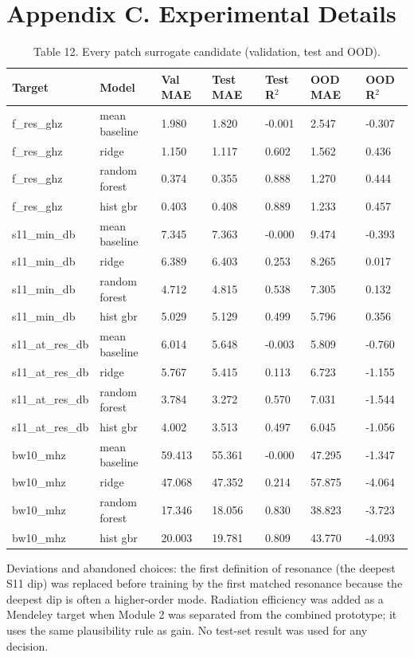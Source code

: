 \documentclass[11pt,a4paper]{article}
\begin{document}
\section*{Appendix C. Experimental Details}
\begin{table}[H]\centering\small
\caption*{Table 12. Every patch surrogate candidate (validation, test and OOD).}
\begin{tabularx}{\linewidth}{XXXXXXX}
\toprule
\textbf{Target} & \textbf{Model} & \textbf{Val MAE} & \textbf{Test MAE} & \textbf{Test R$^2$} & \textbf{OOD MAE} & \textbf{OOD R$^2$} \\
\midrule
f\_res\_ghz & mean baseline & 1.980 & 1.820 & -0.001 & 2.547 & -0.307 \\
f\_res\_ghz & ridge & 1.150 & 1.117 & 0.602 & 1.562 & 0.436 \\
f\_res\_ghz & random forest & 0.374 & 0.355 & 0.888 & 1.270 & 0.444 \\
f\_res\_ghz & hist gbr & 0.403 & 0.408 & 0.889 & 1.233 & 0.457 \\
s11\_min\_db & mean baseline & 7.345 & 7.363 & -0.000 & 9.474 & -0.393 \\
s11\_min\_db & ridge & 6.389 & 6.403 & 0.253 & 8.265 & 0.017 \\
s11\_min\_db & random forest & 4.712 & 4.815 & 0.538 & 7.305 & 0.132 \\
s11\_min\_db & hist gbr & 5.029 & 5.129 & 0.499 & 5.796 & 0.356 \\
s11\_at\_res\_db & mean baseline & 6.014 & 5.648 & -0.003 & 5.809 & -0.760 \\
s11\_at\_res\_db & ridge & 5.767 & 5.415 & 0.113 & 6.723 & -1.155 \\
s11\_at\_res\_db & random forest & 3.784 & 3.272 & 0.570 & 7.031 & -1.544 \\
s11\_at\_res\_db & hist gbr & 4.002 & 3.513 & 0.497 & 6.045 & -1.056 \\
bw10\_mhz & mean baseline & 59.413 & 55.361 & -0.000 & 47.295 & -1.347 \\
bw10\_mhz & ridge & 47.068 & 47.352 & 0.214 & 57.875 & -4.064 \\
bw10\_mhz & random forest & 17.346 & 18.056 & 0.830 & 38.823 & -3.723 \\
bw10\_mhz & hist gbr & 20.003 & 19.781 & 0.809 & 43.770 & -4.093 \\
\bottomrule
\end{tabularx}
\end{table}
Deviations and abandoned choices: the first definition of resonance (the deepest S11 dip) was replaced before training by the first matched resonance because the deepest dip is often a higher-order mode. Radiation efficiency was added as a Mendeley target when Module 2 was separated from the combined prototype; it uses the same plausibility rule as gain. No test-set result was used for any decision.
\end{document}
